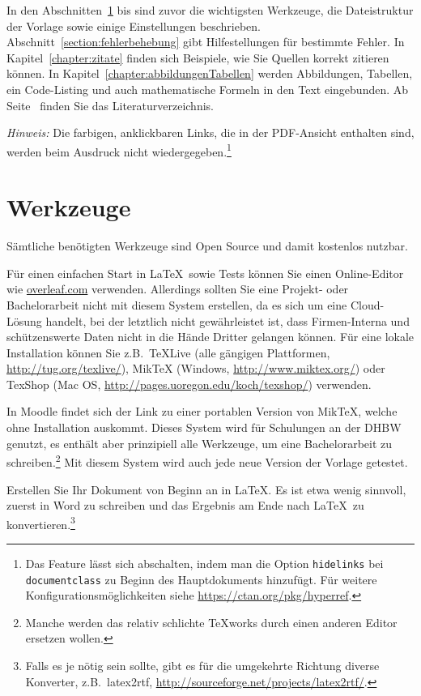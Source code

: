 In den Abschnitten~\ref{section:werkzeuge} bis  sind zuvor die wichtigsten Werkzeuge, die Dateistruktur der Vorlage sowie einige Einstellungen beschrieben. Abschnitt~\ref{section:fehlerbehebung} gibt Hilfestellungen für bestimmte Fehler. In Kapitel~\ref{chapter:zitate} finden sich Beispiele, wie Sie Quellen korrekt zitieren können. In Kapitel~\ref{chapter:abbildungenTabellen} werden Abbildungen, Tabellen, ein Code-Listing und auch mathematische Formeln in den Text eingebunden. Ab Seite~\pageref{chapter:quellen} finden Sie das Literaturverzeichnis.

\emph{Hinweis:} Die farbigen, anklickbaren Links, die in der PDF-Ansicht enthalten sind, werden beim Ausdruck nicht wiedergegeben.\footnote{Das Feature lässt sich abschalten, indem man die Option \texttt{hidelinks} bei \texttt{documentclass} zu Beginn des Hauptdokuments hinzufügt. Für weitere Konfigurationsmöglichkeiten siehe \url{https://ctan.org/pkg/hyperref}.}

\section{Werkzeuge}\label{section:werkzeuge}

Sämtliche benötigten Werkzeuge sind Open Source und damit kostenlos nutzbar.

Für einen einfachen Start in \LaTeX\ sowie Tests können Sie einen Online-Editor wie \url{overleaf.com} verwenden. Allerdings sollten Sie eine Projekt- oder Bachelorarbeit nicht mit diesem System erstellen, da es sich um eine Cloud-Lösung handelt, bei der letztlich nicht gewährleistet ist, dass Firmen-Interna und schützenswerte Daten nicht in die Hände Dritter gelangen können. Für eine lokale Installation können Sie z.B.\ TeXLive (alle gängigen Plattformen, \url{http://tug.org/texlive/}), MikTeX (Windows, \url{http://www.miktex.org/}) oder TexShop (Mac OS, \url{http://pages.uoregon.edu/koch/texshop/}) verwenden.

In Moodle findet sich der Link zu einer portablen Version von MikTeX, welche ohne Installation auskommt. Dieses System wird für Schulungen an der DHBW genutzt, es enthält aber prinzipiell alle Werkzeuge, um eine Bachelorarbeit zu schreiben.\footnote{Manche werden das relativ schlichte TeXworks durch einen anderen Editor ersetzen wollen.} Mit diesem System wird auch jede neue Version der Vorlage getestet.

Erstellen Sie Ihr Dokument von Beginn an in \LaTeX. Es ist etwa wenig sinnvoll, zuerst in Word zu schreiben und das Ergebnis am Ende nach \LaTeX\ zu konvertieren.\footnote{Falls es je nötig sein sollte, gibt es für die umgekehrte Richtung diverse Konverter, z.B.\ latex2rtf, \url{http://sourceforge.net/projects/latex2rtf/}.} 

